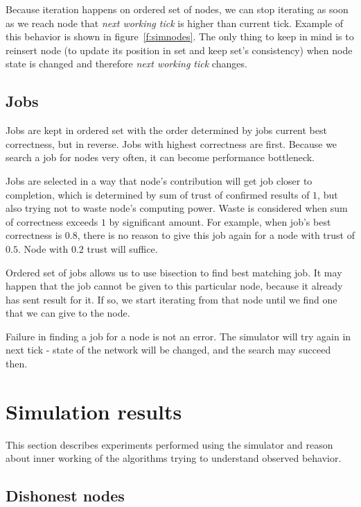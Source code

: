 Because iteration happens on ordered set of nodes, we can stop iterating as soon as we reach node that \emph{next working tick} is higher than current tick. Example of this behavior is shown in figure~\ref{f:simnodes}. The only thing to keep in mind is to reinsert node (to update its position in set and keep set's consistency) when node state is changed and therefore \emph{next working tick} changes.

\subsection{Jobs}

Jobs are kept in ordered set with the order determined by jobs current best correctness, but in reverse. Jobs with highest correctness are first. Because we search a job for nodes very often, it can become performance bottleneck. 

Jobs are selected in a way that node's contribution will get job closer to completion, which is determined by sum of trust of confirmed results of $1$, but also trying not to waste node's computing power. Waste is considered when sum of correctness exceeds $1$ by significant amount. For example, when job's best correctness is $0.8$, there is no reason to give this job again for a node with trust of $0.5$. Node with $0.2$ trust will suffice.

Ordered set of jobs allows us to use bisection to find best matching job. It may happen that the job cannot be given to this particular node, because it already has sent result for it. If so, we start iterating from that node until we find one that we can give to the node.

Failure in finding a job for a node is not an error. The simulator will try again in next tick - state of the network will be changed, and the search may succeed then.

\section{Simulation results}

This section describes experiments performed using the simulator and reason about inner working of the algorithms trying to understand observed behavior.

\subsection{Dishonest nodes}

